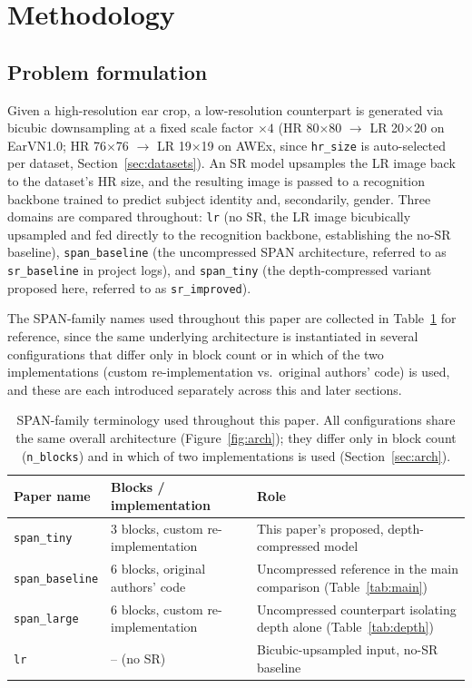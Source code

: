\documentclass[11pt]{article}
\begin{document}
\section{Methodology}
\label{sec:method}

\subsection{Problem formulation}

Given a high-resolution ear crop, a low-resolution counterpart is generated via bicubic downsampling at a fixed scale factor $\times4$ (HR 80$\times$80 $\to$ LR 20$\times$20 on EarVN1.0; HR 76$\times$76 $\to$ LR 19$\times$19 on AWEx, since \texttt{hr\_size} is auto-selected per dataset, Section~\ref{sec:datasets}). An SR model upsamples the LR image back to the dataset's HR size, and the resulting image is passed to a recognition backbone trained to predict subject identity and, secondarily, gender. Three domains are compared throughout: \texttt{lr} (no SR, the LR image bicubically upsampled and fed directly to the recognition backbone, establishing the no-SR baseline), \texttt{span\_baseline} (the uncompressed SPAN architecture, referred to as \texttt{sr\_baseline} in project logs), and \texttt{span\_tiny} (the depth-compressed variant proposed here, referred to as \texttt{sr\_improved}).

The SPAN-family names used throughout this paper are collected in Table~\ref{tab:terminology} for reference, since the same underlying architecture is instantiated in several configurations that differ only in block count or in which of the two implementations (custom re-implementation vs.\ original authors' code) is used, and these are each introduced separately across this and later sections.

\begin{table}[H]
\centering
\caption{SPAN-family terminology used throughout this paper. All configurations share the same overall architecture (Figure~\ref{fig:arch}); they differ only in block count (\texttt{n\_blocks}) and in which of two implementations is used (Section~\ref{sec:arch}).}
\label{tab:terminology}
\begin{tabular}{lll}
\toprule
Paper name & Blocks / implementation & Role \\
\midrule
\texttt{span\_tiny} & 3 blocks, custom re-implementation & This paper's proposed, depth-compressed model \\
\texttt{span\_baseline} & 6 blocks, original authors' code & Uncompressed reference in the main comparison (Table~\ref{tab:main}) \\
\texttt{span\_large} & 6 blocks, custom re-implementation & Uncompressed counterpart isolating depth alone (Table~\ref{tab:depth}) \\
\texttt{lr} & -- (no SR) & Bicubic-upsampled input, no-SR baseline \\
\bottomrule
\end{tabular}
\end{table}
\end{document}

